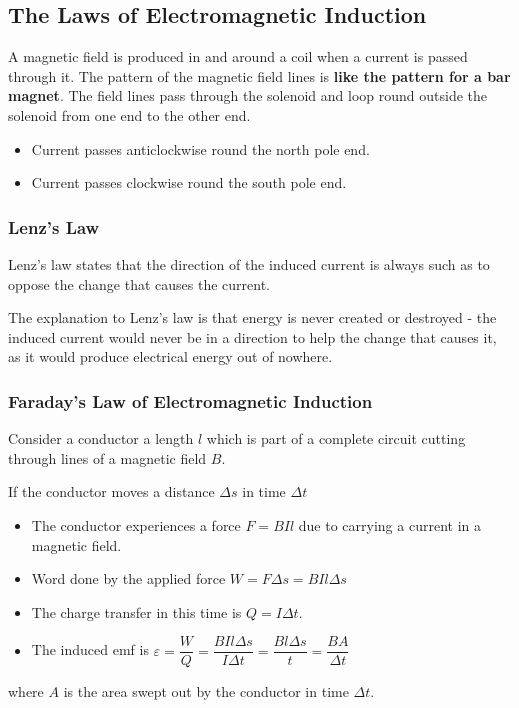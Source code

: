 \subsection{The Laws of Electromagnetic Induction}

A magnetic field is produced in and around a coil when a current is passed through it. The pattern of the magnetic field lines is \textbf{like the pattern for a bar magnet}. The field lines pass through the solenoid and loop round outside the solenoid from one end to the other end.
\begin{itemize}
    \item Current passes anticlockwise round the north pole end.
    \item Current passes clockwise round the south pole end.
\end{itemize}

\subsubsection*{Lenz's Law}

Lenz's law states that the direction of the induced current is always such as to oppose the change that causes the current.

The explanation to Lenz's law is that energy is never created or destroyed - the induced current would never be in a direction to help the change that causes it, as it would produce electrical energy out of nowhere.

\subsubsection*{Faraday's Law of Electromagnetic Induction}

Consider a conductor a length $l$ which is part of a complete circuit cutting through lines of a magnetic field $B$.

If the conductor moves a distance $\Delta s$ in time $\Delta t$
\begin{itemize}
    \item The conductor experiences a force $F=BIl$ due to carrying a current in a magnetic field.
    \item Word done by the applied force $W=F\Delta s=BIl\Delta s$
    \item The charge transfer in this time is $Q=I\Delta t$.
    \item The induced emf is $\varepsilon=\dfrac{W}{Q}=\dfrac{BIl\Delta s}{I\Delta t}=\dfrac{Bl\Delta s}{t}=\dfrac{BA}{\Delta t}$
\end{itemize}
where $A$ is the area swept out by the conductor in time $\Delta t$.

